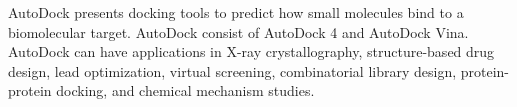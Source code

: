 AutoDock presents docking tools to predict how small molecules bind to a biomolecular target. AutoDock consist of AutoDock 4 and AutoDock Vina. AutoDock can have applications in X-ray crystallography, structure-based drug design, lead optimization, virtual screening, combinatorial library design, protein-protein docking, and chemical mechanism studies.